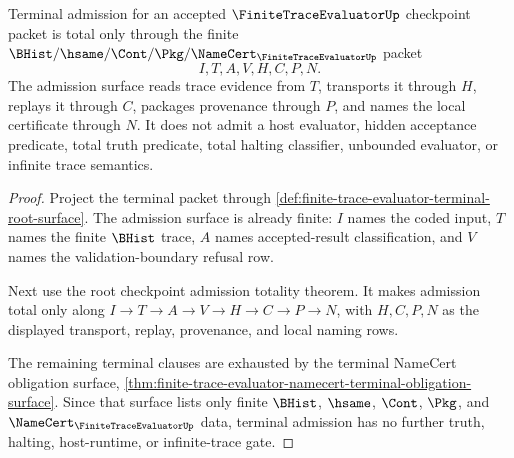 \begin{theorem}
\label{thm:finite-trace-evaluator-terminal-admission-totality}
Terminal admission for an accepted $\FiniteTraceEvaluatorUp$ checkpoint packet
is total only through the finite
$\BHist/\hsame/\Cont/\Pkg/\NameCert_{\FiniteTraceEvaluatorUp}$ packet
$$
I,T,A,V,H,C,P,N.
$$
The admission surface reads trace evidence from $T$, transports it through
$H$, replays it through $C$, packages provenance through $P$, and names the
local certificate through $N$. It does not admit a host evaluator, hidden
acceptance predicate, total truth predicate, total halting classifier,
unbounded evaluator, or infinite trace semantics.
\end{theorem}
\begin{proof}
Project the terminal packet through
\autoref{def:finite-trace-evaluator-terminal-root-surface}. The admission
surface is already finite: $I$ names the coded input, $T$ names the finite
$\BHist$ trace, $A$ names accepted-result classification, and $V$ names the
validation-boundary refusal row.

Next use the root checkpoint admission totality theorem. It makes admission
total only along $I \to T \to A \to V \to H \to C \to P \to N$, with $H,C,P,N$
as the displayed transport, replay, provenance, and local naming rows.

The remaining terminal clauses are exhausted by the terminal NameCert
obligation surface,
\autoref{thm:finite-trace-evaluator-namecert-terminal-obligation-surface}.
Since that surface lists only finite $\BHist$, $\hsame$, $\Cont$, $\Pkg$, and
$\NameCert_{\FiniteTraceEvaluatorUp}$ data, terminal admission has no further
truth, halting, host-runtime, or infinite-trace gate.
\end{proof}

